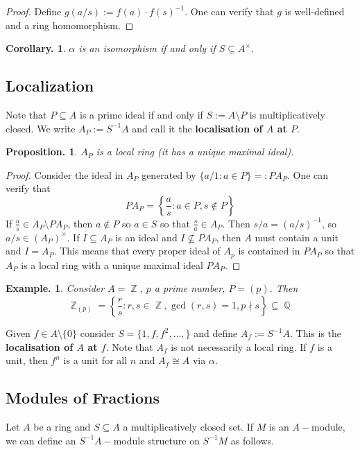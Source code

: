 \documentclass[11pt, a4paper]{memoir}
\DeclareMathOperator{\Q}{{\mathbb{Q}}}
\DeclareMathOperator{\Z}{{\mathbb{Z}}}
\newcommand{\mbf}[1]{{\boldmath\bfseries #1}}
\theoremstyle{change}
\newtheorem{corollary}[theorem]{Corollary.}
\newtheorem{proposition}[theorem]{Proposition.}
\theoremstyle{plain}
\theoremstyle{nonumberplain}
\newtheorem{example}{Example.}
\newtheorem{proof}{Proof}
\numberwithin{equation}{section}
\begin{document}
\begin{proof}
    Define $g(a/s):=f(a)\cdot f(s)^{-1}$.
    One can verify that $g$ is well-defined and a ring homomorphism.
\end{proof}
\begin{corollary}
    $\alpha$ is an isomorphism if and only if $S\subseteq A^\times$.
\end{corollary}
\subsection{Localization}
Note that $P\subseteq A$ is a prime ideal if and only if $S:=A\setminus P$ is multiplicatively closed.
We write $A_P:=S^{-1}A$ and call it the \mbf{localisation of $A$ at $P$}.
\begin{proposition}
    $A_P$ is a local ring (it has a unique maximal ideal).
\end{proposition}
\begin{proof}
    Consider the ideal in $A_P$ generated by $\{a/1:a\in P\}=:PA_P$.
    One can verify that
    \begin{equation*}
        PA_P=\left\{\frac{a}{s}:a\in P,s\notin P\right\}
    \end{equation*}
    If $\frac{a}{s}\in A_P\setminus PA_P$, then $a\notin P$ so $a\in S$ so that $\frac{s}{a}\in A_P$.
    Then $s/a=(a/s)^{-1}$, so $a/s\in (A_P)^\times$.
    If $I\subseteq A_P$ is an ideal and $I\not\subseteq PA_P$, then $A$ must contain a unit and $I=A_P$.
    This means that every proper ideal of $A_p$ is contained in $PA_P$ so that $A_P$ is a local ring with a unique maximal ideal $PA_P$.
\end{proof}
\begin{example}
    Consider $A=\Z$, $p$ a prime number, $P=(p)$.
    Then
    \begin{equation*}
        \Z_{(p)}=\left\{\frac{r}{s}:r,s\in\Z,\gcd(r,s)=1,p\nmid s\right\}\subseteq\Q
    \end{equation*}
\end{example}
Given $f\in A\setminus\{0\}$ consider $S=\{1,f,f^2,\ldots,\}$ and define $A_f:= S^{-1}A$.
This is the \mbf{localisation of $A$ at $f$}.
Note that $A_f$ is not necessarily a local ring.
If $f$ is a unit, then $f^n$ is a unit for all $n$ and $A_f\cong A$ via $\alpha$.

\subsection{Modules of Fractions}
Let $A$ be a ring and $S\subseteq A$ a multiplicatively closed set.
If $M$ is an $A-$module, we can define an $S^{-1}A-$module structure on $S^{-1}M$ as follows.
\end{document}
